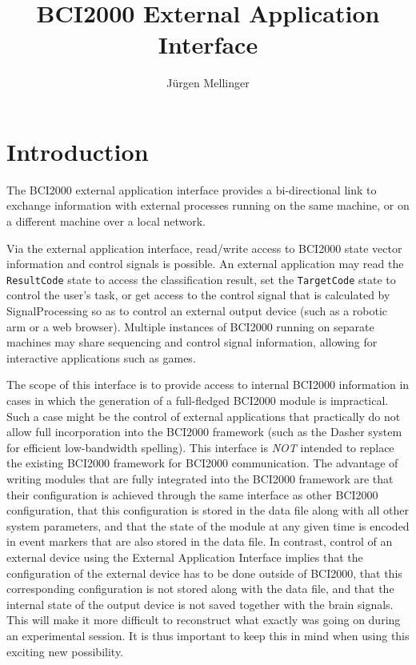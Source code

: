 \documentclass[12pt,letter,notitlepage]{article}
\title{BCI2000 External Application Interface}
\author{J\"{u}rgen Mellinger}
\begin{document}
\maketitle
\tableofcontents

\pagebreak
\section{Introduction}

The BCI2000 external application interface provides a bi-directional link to exchange 
information with external processes running on the same machine, or on a different machine
over a local network.

Via the external application interface, read/write access to BCI2000 state 
vector information and control signals is possible. An external application may 
read the \texttt{ResultCode} state to access the classification result, set the 
\texttt{TargetCode} state to control the user's task, or get access to the 
control signal that is calculated by SignalProcessing so as to control an 
external output device (such as a robotic arm or a web browser). Multiple 
instances of BCI2000 running on separate machines may share sequencing and 
control signal information, allowing for interactive applications such as games.

The scope of this interface is to provide access to internal BCI2000 information 
in cases in which the generation of a full-fledged BCI2000 module is 
impractical. Such a case might be the control of external applications that 
practically do not allow full incorporation into the BCI2000 framework (such as 
the Dasher system for efficient low-bandwidth spelling). This interface is 
\emph{NOT} intended to replace the existing BCI2000 framework for BCI2000 
communication. The advantage of writing modules that are fully integrated into 
the BCI2000 framework are that their configuration is achieved through the same 
interface as other BCI2000 configuration, that this configuration is stored in 
the data file along with all other system parameters, and that the state of the 
module at any given time is encoded in event markers that are also stored in the 
data file. In contrast, control of an external device using the External 
Application Interface implies that the configuration of the external device has 
to be done outside of BCI2000, that this corresponding configuration is not 
stored along with the data file, and that the internal state of the output 
device is not saved together with the brain signals. This will make it more 
difficult to reconstruct what exactly was going on during an experimental 
session. It is thus important to keep this in mind when using this exciting new 
possibility.
\end{document}
